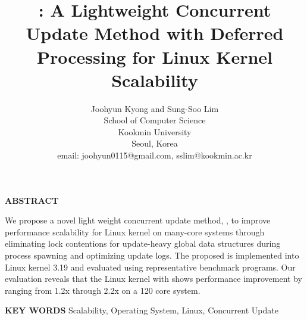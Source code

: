 \documentclass[twocolumn,letterpaper,10pt]{article}
\begin{document}
\date{}

\title{: A Lightweight Concurrent Update Method with Deferred Processing
for Linux Kernel Scalability}

\author{
Joohyun Kyong and Sung-Soo Lim\\
School of Computer Science\\
Kookmin University\\
Seoul, Korea\\
email: joohyun0115@gmail.com, sslim@kookmin.ac.kr \\
}

\maketitle

\thispagestyle{empty}

\noindent
{\bf\normalsize ABSTRACT}\newline
{
We propose a novel light weight concurrent update method, , 
to improve performance scalability for Linux kernel on many-core systems
through eliminating lock contentions for update-heavy global data structures
during process spawning and optimizing update logs. 
The proposed  is implemented into Linux kernel 3.19 and evaluated 
using representative benchmark programs. 
Our evaluation reveals that the Linux kernel with  shows performance
improvement by ranging from 1.2x through 2.2x on a 120 core system.

} \vspace{2ex}
   
\noindent
{\bf\normalsize KEY WORDS}\newline
{Scalability, Operating System, Linux, Concurrent Update}









{


}

\end{document}
